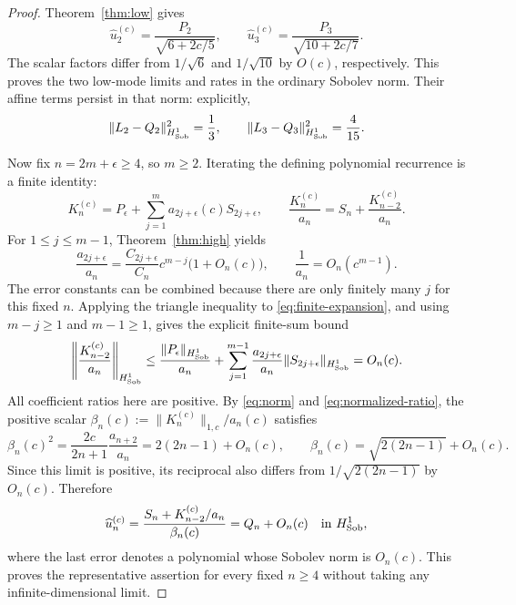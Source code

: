 ﻿\documentclass[11pt]{article}
\begin{document}
\begin{proof}
	Theorem~\ref{thm:low} gives
	\begin{equation*}
		\widehat u_2^{(c)}=\frac{P_2}{\sqrt{6+2c/5}},\qquad
		\widehat u_3^{(c)}=\frac{P_3}{\sqrt{10+2c/7}}.
	\end{equation*}
	The scalar factors differ from $1/\sqrt6$ and $1/\sqrt{10}$ by
	$O(c)$, respectively.  This proves the two low-mode limits and rates
	in the ordinary Sobolev norm.  Their affine terms persist in that
	norm: explicitly,
	\begin{equation*}
		\|L_2-Q_2\|_{H^1_{\rm Sob}}^2=\frac13,\qquad
		\|L_3-Q_3\|_{H^1_{\rm Sob}}^2=\frac4{15}.
	\end{equation*}

	Now fix $n=2m+\epsilon\ge4$, so $m\ge2$.  Iterating the defining
	polynomial recurrence is a finite identity:
	\begin{equation}
		K_n^{(c)}=P_\epsilon+
		\sum_{j=1}^m a_{2j+\epsilon}(c)S_{2j+\epsilon},\qquad
		\frac{K_n^{(c)}}{a_n}=S_n+\frac{K_{n-2}^{(c)}}{a_n}.
		\label{eq:finite-expansion}
	\end{equation}
	For $1\le j\le m-1$, Theorem~\ref{thm:high} yields
	\begin{equation*}
		\frac{a_{2j+\epsilon}}{a_n}
		=\frac{C_{2j+\epsilon}}{C_n}c^{m-j}\bigl(1+O_n(c)\bigr),
		\qquad \frac1{a_n}=O_n(c^{m-1}).
	\end{equation*}
	The error constants can be combined because there are only finitely
	many $j$ for this fixed $n$.  Applying the triangle inequality to
	\eqref{eq:finite-expansion}, and using $m-j\ge1$ and $m-1\ge1$,
	gives the explicit finite-sum bound
	\begin{equation}
		\left\|\frac{K_{n-2}^{(c)}}{a_n}\right\|_{H^1_{\rm Sob}}
		\le\frac{\|P_\epsilon\|_{H^1_{\rm Sob}}}{a_n}
		+\sum_{j=1}^{m-1}\frac{a_{2j+\epsilon}}{a_n}
		\|S_{2j+\epsilon}\|_{H^1_{\rm Sob}}
		=O_n(c).
		\label{eq:polynomial-remainder}
	\end{equation}
	All coefficient ratios here are positive.  By \eqref{eq:norm} and
	\eqref{eq:normalized-ratio}, the positive scalar
	$\beta_n(c):=\|K_n^{(c)}\|_{1,c}/a_n(c)$ satisfies
	\begin{equation*}
		\beta_n(c)^2=\frac{2c}{2n+1}\frac{a_{n+2}}{a_n}
		=2(2n-1)+O_n(c),\qquad
		\beta_n(c)=\sqrt{2(2n-1)}+O_n(c).
	\end{equation*}
	Since this limit is positive, its reciprocal also differs from
	$1/\sqrt{2(2n-1)}$ by $O_n(c)$.  Therefore
	\begin{equation*}
		\widehat u_n^{(c)}
		=\frac{S_n+K_{n-2}^{(c)}/a_n}{\beta_n(c)}
		=Q_n+O_n(c)\quad\text{in }H^1_{\rm Sob},
	\end{equation*}
	where the last error denotes a polynomial whose Sobolev norm is
	$O_n(c)$.  This proves the representative assertion for every fixed
	$n\ge4$ without taking any infinite-dimensional limit.


\end{proof}
\end{document}
